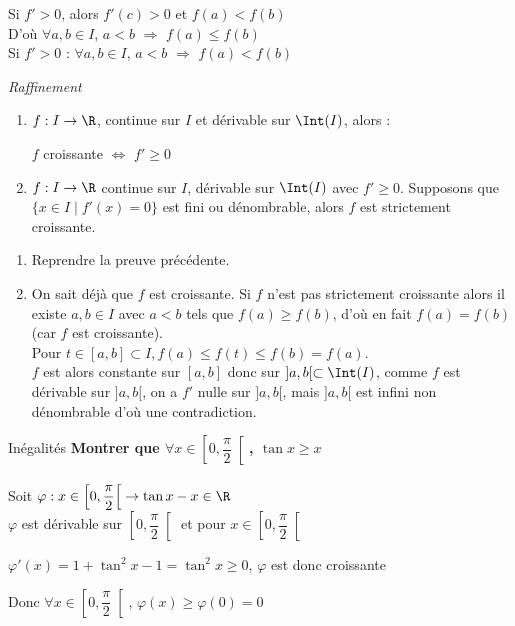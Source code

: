 \documentclass[12pt,a4paper]{report}
\begin{document}
\begin{remarque}
Si $f'>0$, alors $f'(c)>0$ et $f(a)<f(b)$\\
D'où $\forall a,b \in I$, $a<b$ $\Longrightarrow$ $f(a) \leq f(b)$\\
Si $f'>0$ : $\forall a,b \in I$, $a<b$ $\Longrightarrow$ $f(a) < f(b)$
\end{remarque}

\begin{corollaire}{\textit{Raffinement}}{}
\begin{enumerate}
	\item $f:I\to \R$, continue sur $I$ et dérivable sur $\Int(I)$, alors :
	\begin{center}
    	$f$ croissante $\Longleftrightarrow$ $f'\geq 0$
	\end{center}
	
	\item $f : I \to \R$ continue sur $I$, dérivable sur $\Int(I)$ avec $f' \geq 0$. Supposons que $\{x \in I \mid f'(x) = 0 \}$ est fini ou dénombrable, alors $f$ est strictement croissante.
\end{enumerate}
\end{corollaire}

\begin{demo}{}
\begin{enumerate}
	\item Reprendre la preuve précédente.
	\item On sait déjà que $f$ est croissante. Si $f$ n'est pas strictement croissante alors il existe $a,b \in I$ avec $a<b$ tels que $f(a) \geq f(b)$, d'où en fait $f(a)= f(b)$ (car $f$ est croissante). \\
	Pour $t \in [a,b] \subset I, f(a) \leq f(t) \leq f(b) = f(a)$. \\
	$f$ est alors constante sur $[a,b]$ donc sur $]a,b[ \subset \Int(I)$, comme $f$ est dérivable sur $]a,b[$, on a $f'$ nulle sur $]a,b[$, mais $]a,b[$ est infini non dénombrable d'où une contradiction.
\end{enumerate}
\end{demo}

\begin{application}{Inégalités}{}
\textbf{Montrer que $\forall x \in \left[0, \dfrac{\pi}{2}\right[$, $\tan x \geq x$}\\
\\
Soit $\varphi:x \in \left[0, \dfrac{\pi}{2}\right[ \rightarrow \tan x -x \in \R$\\
$\varphi$ est dérivable sur $\left[0, \dfrac{\pi}{2}\right[$ et pour $x\in \left[0, \dfrac{\pi}{2}\right[$
\begin{center}
    $\varphi'(x)=1+\tan^2 x - 1 = \tan^2 x \geq 0$, $\varphi$ est donc croissante
\end{center}
Donc $\forall x \in \left[0, \dfrac{\pi}{2}\right[$, $\varphi(x) \geq \varphi(0)=0$
\end{application}
\end{document}
